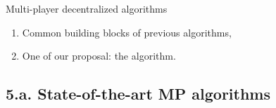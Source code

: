 \documentclass[12pt,english,ignorenonframetext,]{beamer}
\providecommand{\tightlist}{%
  \setlength{\itemsep}{0pt}\setlength{\parskip}{0pt}}
\begin{document}
\begin{frame}{Multi-player decentralized algorithms}

\begin{enumerate}
\def\labelenumi{\arabic{enumi}.}
\tightlist
\item
  Common building blocks of previous algorithms,\vspace*{15pt}
\item
  One of our proposal: the \MCTopM{} algorithm.
\end{enumerate}

\end{frame}



\subsection{\hfill{}5.a. State-of-the-art MP algorithms\hfill{}}
\end{document}
